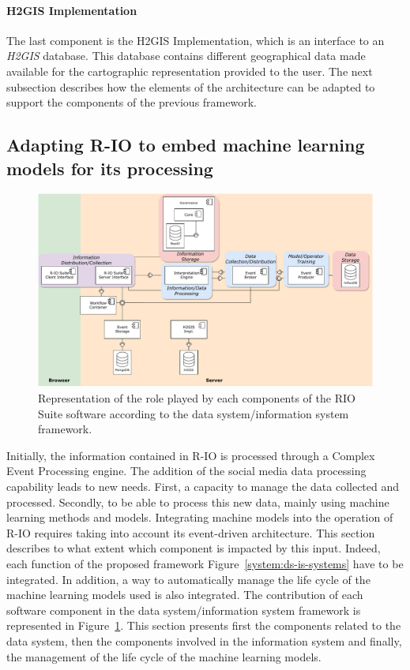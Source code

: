 \paragraph{H2GIS Implementation}
The last component is the H2GIS Implementation, which is an interface to an \textit{H2GIS} database.
This database contains different geographical data made available for the cartographic representation provided to the user.
The next subsection describes how the elements of the architecture can be adapted to support the components of the previous framework.

\subsection{Adapting R-IO to embed machine learning models for its processing}
\begin{figure}[htb]
    \centering
    \includegraphics[width=\textwidth]{figures/chap-5/RIO-archi-concepts.pdf}
    \caption{Representation of the role played by each components of the RIO Suite software according to the data system/information system framework.}
    \label{system:rio-archi-contribution}
\end{figure}

Initially, the information contained in R-IO is processed through a Complex Event Processing engine.
The addition of the social media data processing capability leads to new needs.
First, a capacity to manage the data collected and processed.
Secondly, to be able to process this new data, mainly using machine learning methods and models.
Integrating machine models into the operation of R-IO requires taking into account its event-driven architecture.
This section describes to what extent which component is impacted by this input.
Indeed, each function of the proposed framework Figure~\ref{system:ds-is-systems} have to be integrated.
In addition, a way to automatically manage the life cycle of the machine learning models used is also integrated.
The contribution of each software component in the data system/information system framework is represented in Figure~\ref{system:rio-archi-contribution}.
This section presents first the components related to the data system, then the components involved in the information system and finally, the management of the life cycle of the machine learning models.

